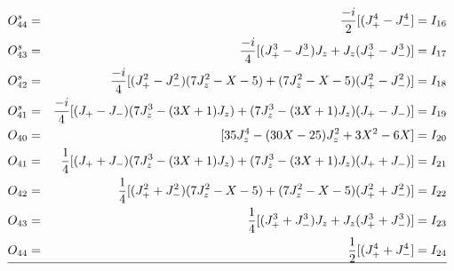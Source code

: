 \begin{eqnarray*}
O^s_{44}&=&\frac{-i}{2}[(J_+^4-J_-^4]=I_{16}\\
O^s_{43}&=&\frac{-i}{4}[(J_+^3-J_-^3)J_z+J_z(J_+^3-J_-^3)] =I_{17}\\
O^s_{42}&=&\frac{-i}{4}[(J_+^2-J_-^2)(7J_z^2-X-5)+(7J_z^2-X-5)(J_+^2-J_-^2)]=I_{18} \\
O^s_{41}&=&\frac{-i}{4}[(J_+-J_-)(7J_z^3-(3X+1)J_z)+(7J_z^3-(3X+1)J_z)(J_+-J_-)]=I_{19} \\
O_{40}&=&[35J_z^4-(30X-25)J_z^2+3X^2-6X]=I_{20} \\
O_{41}&=&\frac{1}{4}[(J_++J_-)(7J_z^3-(3X+1)J_z)+(7J_z^3-(3X+1)J_z)(J_++J_-)]=I_{21} \\
O_{42}&=&\frac{1}{4}[(J_+^2+J_-^2)(7J_z^2-X-5)+(7J_z^2-X-5)(J_+^2+J_-^2)] =I_{22}\\
O_{43}&=&\frac{1}{4}[(J_+^3+J_-^3)J_z+J_z(J_+^3+J_-^3)]=I_{23} \\
O_{44}&=&\frac{1}{2}[(J_+^4+J_-^4]=I_{24}\\
\hline
\end{eqnarray*}
